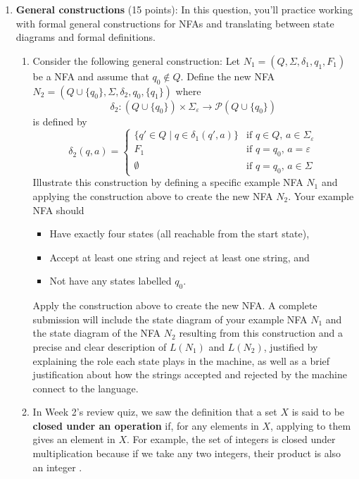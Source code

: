 \begin{enumerate}[wide, labelwidth=!, labelindent=0pt]
\item\textbf{General constructions} (15 points):
In this question, you'll practice working with formal general constructions
for NFAs and translating between state diagrams and formal definitions.

\begin{enumerate}
\item\gradeCorrect Consider the following general construction: Let $N_1 = (Q, \Sigma, \delta_1, q_1, F_1)$ be a NFA
and assume that $q_0 \notin Q$.
Define the new NFA $N_2 = (Q \cup \{q_0\}, \Sigma, \delta_2, q_0, \{q_1\})$ where 
$$\delta_2: (Q \cup \{q_0\}) \times \Sigma_\varepsilon \to \mathcal{P} (Q \cup \{q_0\})$$ is defined by
\[
    \delta_2 (q,a) = \begin{cases}
        \{ q' \in Q \mid q \in \delta_1(q',a)\} &\text{if $q \in Q$, $a \in \Sigma_{\varepsilon}$} \\
        F_1 &\text{if $q =q_0$, $a = \varepsilon$}\\
        \emptyset &\text{if $q = q_0$, $a \in \Sigma$}
    \end{cases}
\]
Illustrate this construction by defining a specific example NFA $N_1$ and applying the 
construction above to create the new NFA $N_2$. Your example NFA should
\begin{itemize}
    \item Have exactly four states (all reachable from the start state),
    \item Accept at least one string and reject at least one string, and
    \item Not have any states labelled $q_0$.
\end{itemize}
Apply the construction above to create the new NFA. A complete submission 
will include the state diagram of your example NFA $N_1$ and the state diagram of the NFA $N_2$ resulting 
from this construction and a precise and clear description of $L(N_1)$ and $L(N_2)$, justified
by explaining the role each state plays in the machine, as well as a brief 
justification about how the strings accepted and rejected by the machine connect to the language.

\item 
In Week 2's review quiz, we saw the definition that a set $X$ is said to be 
{\bf closed under an operation} if, for any elements in
$X$, applying to them gives an element in $X$. For example, the set of
integers is closed under multiplication because if we take any two
integers, their product is also an integer .


\end{enumerate}
\end{enumerate}
